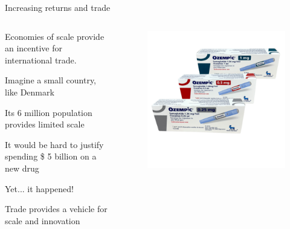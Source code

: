 \documentclass[notes,11pt, aspectratio=169, xcolor=table]{beamer}
\newenvironment{wideitemize}{\itemize\addtolength{\itemsep}{10pt}}{\enditemize}
\begin{document}
\begin{frame}{Increasing returns and trade}
\normalsize

\begin{columns}[T] %
\begin{column}{.45\textwidth}

        \begin{wideitemize}
    \item Economies of scale provide an incentive for international trade.
    \item<2-> Imagine a small country, like Denmark
    \item<3-> Its 6 million population provides limited scale
    \item<4-> It would be hard to justify spending \$ 5 billion on a new drug
    \item<5-> Yet... it happened!
    \item<7-> Trade provides a vehicle for scale and innovation
    
\end{wideitemize}
            
                
    \end{column}
    \begin{column}{.45\textwidth}

     {

    \begin{figure}
        \centering
        \includegraphics[width=\linewidth]{figs/Ozempic025051-1-600x600.png}
    \end{figure}

    
    }

\end{column}
\end{columns}




\end{frame}
\end{document}
